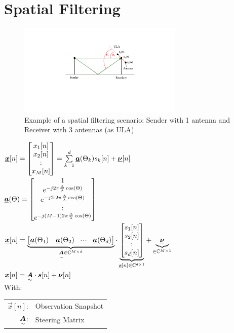 \section{Spatial Filtering}
\begin{doublespace}
\begin{figure}[htbp]
	\centering
		\includegraphics[trim =6cm 7cm 6cm 4cm, clip,width=0.70\textwidth]{graphics/Spatial_filtering_antenna_example.pdf}
	\caption{Example of a spatial filtering scenario: Sender with 1 antenna and Receiver with 3 antennas (as ULA)}
	\label{fig:SPatial_filtering_antenna_example}
\end{figure}
$\underline{\boldsymbol {x}}[n]=\begin{bmatrix} x_1[n]\\x_2[n]\\:\\x_M[n] \end{bmatrix}=\sum\limits_{k=1}^{d}\underline{\boldsymbol {a}}(\Theta_k)s_k[n]+\underline{\boldsymbol {\nu}}[n]$\\
$\underline{\boldsymbol {a}}(\Theta)=\begin{bmatrix} 1\\e^{-j2\pi \frac{\Delta}{\lambda} \cos(\Theta)}\\e^{-j 2 \cdot 2\pi \frac{\Delta}{\lambda} \cos(\Theta)}\\:\\e^{-j(M-1)2\pi \frac{\Delta}{\lambda} \cos(\Theta)} \end{bmatrix}$\\
$\underline{\boldsymbol {x}}[n]=\underbrace{\begin{bmatrix} \underline{\boldsymbol {a}}(\Theta_1)&\underline{\boldsymbol {a}}(\Theta_2)&\!\cdot \!\cdot\!\cdot\!&\underline{\boldsymbol {a}}(\Theta_d) \end{bmatrix}}_{\underset{\sim}{\boldsymbol {A}}\in\mathbb{C}^{M\times d}}\cdot\underbrace{\begin{bmatrix} s_1[n]\\s_2[n]\\:\\s_d[n] \end{bmatrix}}_{\underline{\boldsymbol {s}}[n]\in\mathbb{C}^{d\times 1}}+\underbrace{\underline{\boldsymbol {\nu}}}_{\in\mathbb{C}^{M\times 1}}$\\
$\underline{\boldsymbol {x}}[n]=\underset{\sim}{\boldsymbol {A}}\cdot \underline{\boldsymbol {s}}[n]+\underline{\boldsymbol {\nu}}[n]$\\
With:\\
\begin{tabular}{rl}
$\vec{x}[n]$: & Observation Snapshot\\
$\underset{\sim}{\boldsymbol {A}}$: & Steering Matrix\\

\end{tabular}
\end{doublespace}
